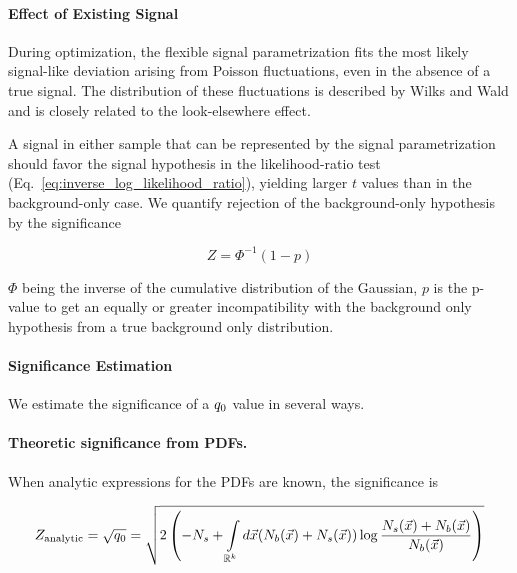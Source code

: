 \documentclass[paper/ddppaper2.tex]{subfiles}
\begin{document}
\paragraph{Effect of Existing Signal}

During optimization, the flexible signal parametrization fits the most likely signal-like deviation arising from Poisson fluctuations, even in the absence of a true signal. The distribution of these fluctuations is described by Wilks and Wald and is closely related to the look-elsewhere effect.

A signal in either sample that can be represented by the signal parametrization should favor the signal hypothesis in the likelihood-ratio test (Eq.~\ref{eq:inverse_log_likelihood_ratio}), yielding larger $t$ values than in the background-only case. We quantify rejection of the background-only hypothesis by the significance

\begin{equation}
    Z = \Phi^{-1}(1-p)
\end{equation}

\noindent $\Phi$ being the inverse of the cumulative distribution of the Gaussian, $p$ is the p-value to get an equally or greater incompatibility with the background only hypothesis from a true background only distribution.

\paragraph{Significance Estimation}

We estimate the significance of a ${q_{0}}$ value in several ways.


    \paragraph{Theoretic significance from PDFs.}

    When analytic expressions for the PDFs are known, the significance is

    \begin{wideequations}
\begin{equation}
    \label{eq:analytic_significance_from_pdfs}
        Z_\text{analytic} = \sqrt{\invllratio} = \sqrt  {
            2 \left( -N_s + \int\limits_{\mathbb{R}^{k}} d\anyevent (N_b(\anyevent) + N_s(\anyevent)) \log \dfrac{N_s(\anyevent) + N_b(\anyevent)}{N_b(\anyevent)} \right)
        }
    \end{equation}
\end{wideequations}
\end{document}
